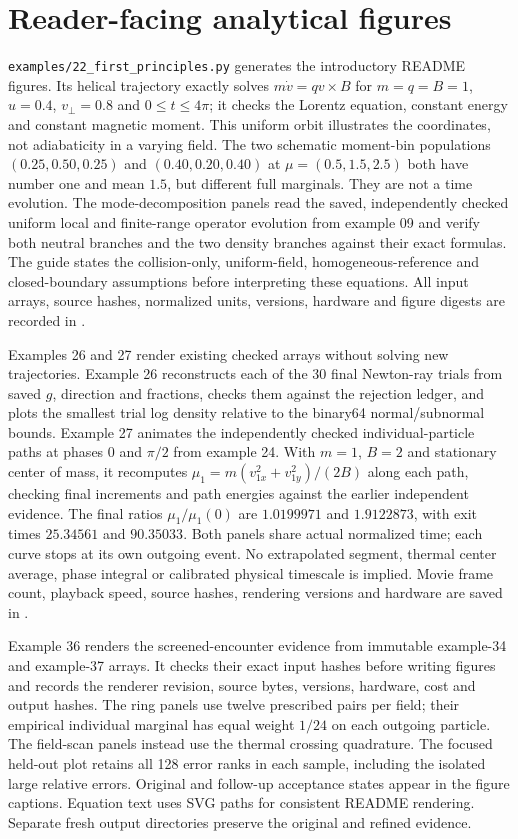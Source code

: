 \documentclass[11pt,letterpaper]{article}
\begin{document}
\section{Reader-facing analytical figures}
\texttt{examples/22\_first\_principles.py} generates the introductory README
figures. Its helical trajectory exactly solves $m\dot v=qv\times B$ for
$m=q=B=1$, $u=0.4$, $v_\perp=0.8$ and $0\le t\le4\pi$; it checks the
Lorentz equation, constant energy and constant magnetic moment. This uniform
orbit illustrates the coordinates, not adiabaticity in a varying field.
The two schematic moment-bin populations $(0.25,0.50,0.25)$ and
$(0.40,0.20,0.40)$ at $\mu=(0.5,1.5,2.5)$ both have number one and mean
$1.5$, but different full marginals. They are not a time evolution.
The mode-decomposition panels read the saved, independently checked uniform
local and finite-range operator evolution from example 09 and verify both
neutral branches and the two density branches against their exact formulas.
The guide states the collision-only, uniform-field, homogeneous-reference and
closed-boundary assumptions before interpreting these equations.
All input arrays, source hashes, normalized units, versions, hardware and
figure digests are recorded in .

Examples 26 and 27 render existing checked arrays without solving new
trajectories. Example 26 reconstructs each of the 30 final Newton-ray trials
from saved $g$, direction and fractions, checks them against the rejection
ledger, and plots the smallest trial log density relative to the binary64
normal/subnormal bounds. Example 27 animates the independently checked
individual-particle paths at phases $0$ and $\pi/2$ from example 24.
With $m=1$, $B=2$ and stationary center of mass, it recomputes
$\mu_1=m(v_{1x}^2+v_{1y}^2)/(2B)$ along each path, checking final increments
and path energies against the earlier independent evidence. The final
ratios $\mu_1/\mu_1(0)$ are $1.0199971$ and $1.9122873$, with exit times
$25.34561$ and $90.35033$. Both panels share actual normalized time; each
curve stops at its own outgoing event. No extrapolated segment, thermal
center average, phase integral or calibrated physical timescale is implied.
Movie frame count, playback speed, source hashes, rendering versions and
hardware are saved in .

Example 36 renders the screened-encounter evidence from immutable example-34
and example-37 arrays. It checks their exact input hashes before writing
figures and records the renderer revision, source bytes, versions, hardware,
cost and output hashes. The ring panels use twelve prescribed pairs per
field; their empirical individual marginal has equal weight $1/24$ on
each outgoing particle. The field-scan panels instead use the thermal
crossing quadrature. The focused held-out plot retains all 128 error
ranks in each sample, including the isolated large relative errors.
Original and follow-up acceptance states appear in the figure captions.
Equation text uses SVG paths for consistent README rendering. Separate
fresh output directories preserve the original and refined evidence.
\end{document}
